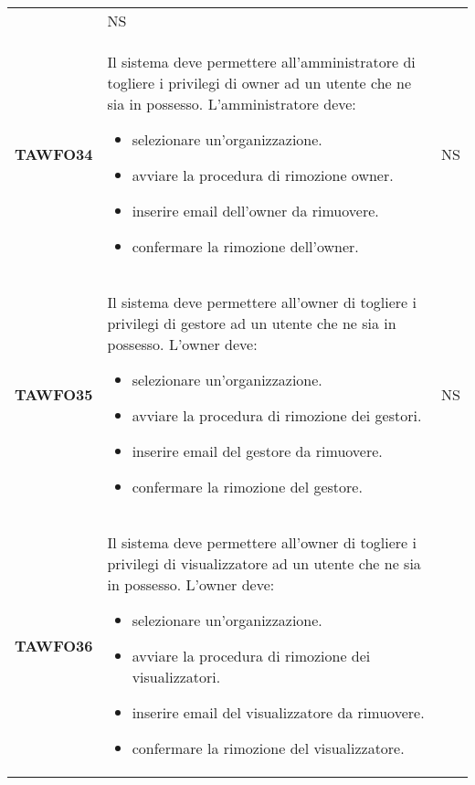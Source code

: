 \documentclass[../piano-di-qualifica.tex]{subfiles}
\begin{document}
\begin{centering}
\begin{longtable}[H]{>{\centering\bfseries}m{3cm} >{}p{10cm} >{\centering\arraybackslash}m{3cm}}
\begin{itemize}
                        \end{itemize}
                      & NS \\
        TAWFO34       & Il sistema deve permettere all'amministratore di togliere i privilegi di owner ad un utente che ne sia in possesso. \newline
                        L'amministratore deve:
                        \begin{itemize}
                          \item selezionare un'organizzazione.
                          \item avviare la procedura di rimozione owner.
                          \item inserire email dell'owner da rimuovere.
                          \item confermare la rimozione dell'owner.
                        \end{itemize}
                      & NS \\
        TAWFO35       & Il sistema deve permettere all'owner di togliere i privilegi di gestore ad un utente che ne sia in possesso. \newline
                        L'owner deve:
                        \begin{itemize}
                          \item selezionare un'organizzazione.
                          \item avviare la procedura di rimozione dei gestori.
                          \item inserire email del gestore da rimuovere.
                          \item confermare la rimozione del gestore.
                        \end{itemize}
                      & NS \\
        TAWFO36       & Il sistema deve permettere all'owner di togliere i privilegi di visualizzatore ad un utente che ne sia in possesso. \newline
                        L'owner deve:
                        \begin{itemize}
                          \item selezionare un'organizzazione.
                          \item avviare la procedura di rimozione dei visualizzatori.
                          \item inserire email del visualizzatore da rimuovere.
                          \item confermare la rimozione del visualizzatore.

\end{itemize}
\end{longtable}
\end{centering}
\end{document}
